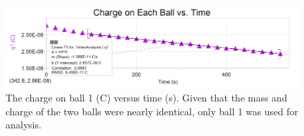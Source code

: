\documentclass[oneside,12pt]{amsart}
\begin{document}
\begin{figure}[h]
	\includegraphics[width=\linewidth,scale=0.01]{ChargevTime.png}
	\caption{The charge on ball 1 (C) versus time (s). Given that the mass and charge of the two balls were nearly identical, only ball 1 was used for analysis.}
	\label{Charge}
\end{figure}
	
\end{document}
